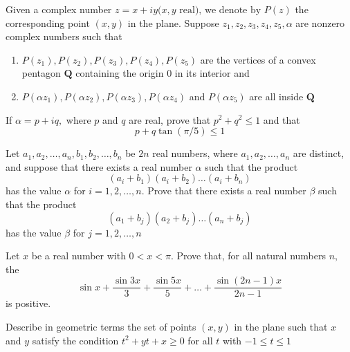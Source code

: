 \documentclass{pset}
\begin{document}
\begin{problems}
\begin{problem}[IrMO 1993 Q5]
    Given a complex number \(z=x+i y(x, y \text { real), we denote by } P(z)\) the corresponding point \((x, y)\) in the plane. Suppose \(z_{1}, z_{2}, z_{3}, z_{4}, z_{5}, \alpha\) are nonzero complex numbers such that
    \begin{enumerate}
        \item \(P\left(z_{1}\right), P\left(z_{2}\right), P\left(z_{3}\right), P\left(z_{4}\right), P\left(z_{5}\right)\) are the vertices of a convex pentagon \(\mathbf{Q}\) containing the origin 0 in its interior and
        \item \(P\left(\alpha z_{1}\right), P\left(\alpha z_{2}\right), P\left(\alpha z_{3}\right), P\left(\alpha z_{4}\right)\) and \(P\left(\alpha z_{5}\right)\) are all inside \(\mathbf{Q}\)
    
    \end{enumerate}
    If \(\alpha=p+i q,\) where \(p\) and \(q\) are real, prove that \(p^{2}+q^{2} \leq 1\) and that
    $$
    p+q \tan (\pi / 5) \leq 1
    $$
\end{problem}

\begin{problem}[IrMO 1993 Q7]
    Let \(a_{1}, a_{2}, \ldots, a_{n}, b_{1}, b_{2}, \ldots, b_{n}\) be \(2 n\) real numbers, where \(a_{1}, a_{2}, \ldots, a_{n}\) are distinct, and suppose that there exists a real number \(\alpha\) such that the product
    $$
    \left(a_{i}+b_{1}\right)\left(a_{i}+b_{2}\right) \ldots\left(a_{i}+b_{n}\right)
    $$
    has the value \(\alpha\) for \(i=1,2, \ldots, n .\) Prove that there exists a real number \(\beta\) such that the product
    $$
    \left(a_{1}+b_{j}\right)\left(a_{2}+b_{j}\right) \ldots\left(a_{n}+b_{j}\right)
    $$
    has the value \(\beta\) for \(j=1,2, \ldots, n\)
\end{problem}

\begin{problem}[IrMO 1993 Q9]
    Let \(x\) be a real number with \(0<x<\pi .\) Prove that, for all natural numbers \(n,\) the
    $$
    \sin x+\frac{\sin 3 x}{3}+\frac{\sin 5 x}{5}+\ldots+\frac{\sin (2 n-1) x}{2 n-1}
    $$
    is positive.
\end{problem}



\begin{problem}[IrMO 1992 Q1]
    Describe in geometric terms the set of points \((x, y)\) in the plane such that \(x\) and \(y\) satisfy the condition \(t^{2}+y t+x \geq 0\) for all \(t\) with \(-1 \leq t \leq 1\)
\end{problem}


\end{problems}
\end{document}
